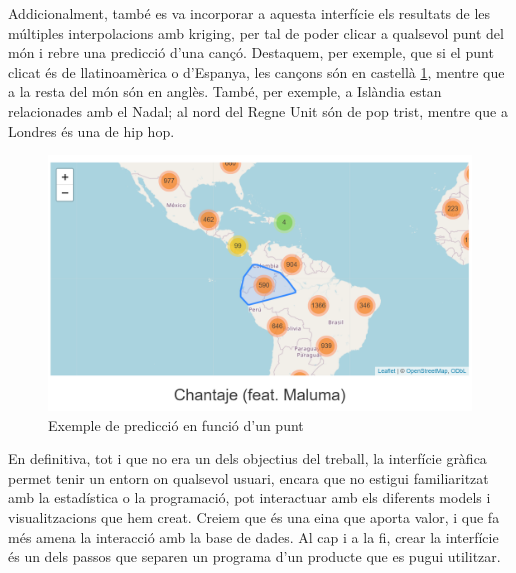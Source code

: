 Addicionalment, també es va incorporar a aquesta interfície els resultats de les múltiples interpolacions amb kriging, per tal de poder clicar a qualsevol punt del món i rebre una predicció d'una cançó. Destaquem, per exemple, que si el punt clicat és de llatinoamèrica o d'Espanya, les cançons són en castellà \ref{fig:gui_geotextual}, mentre que a la resta del món són en anglès. També, per exemple, a Islàndia estan relacionades amb el Nadal; al nord del Regne Unit són de pop trist, mentre que a Londres és una de hip hop.

\begin{figure}
    \centering
    \includegraphics[width=0.75\linewidth]{Images//8_Textual//Geotextual/GUI_geotextual.png}
    \caption{Exemple de predicció en funció d'un punt}
    \label{fig:gui_geotextual}
\end{figure}

En definitiva, tot i que no era un dels objectius del treball, la interfície gràfica permet tenir un entorn on qualsevol usuari, encara que no estigui familiaritzat amb la estadística o la programació, pot interactuar amb els diferents models i visualitzacions que hem creat. Creiem que és una eina que aporta valor, i que fa més amena la interacció amb la base de dades. Al cap i a la fi, crear la interfície és un dels passos que separen un programa d'un producte que es pugui utilitzar.
